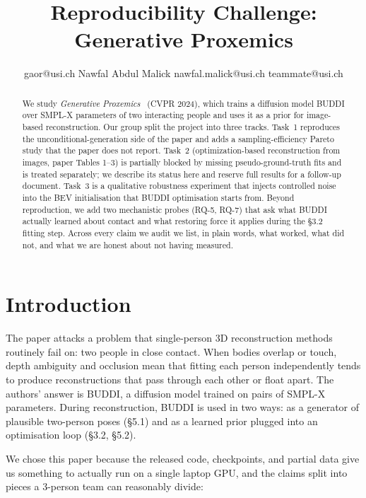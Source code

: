 \documentclass[10pt]{article}
\title{Reproducibility Challenge: Generative Proxemics}
\author{%
  \name [Author A] \email gaor@usi.ch
  \AND
  \name Nawfal Abdul Malick \email nawfal.malick@usi.ch
  \AND
  \name [Author C] \email teammate@usi.ch
}
\begin{document}
\maketitle

\begin{abstract}
We study \emph{Generative Proxemics}~\citep{muller2024generative} (CVPR 2024), which trains a diffusion model BUDDI over SMPL-X parameters of two interacting people and uses it as a prior for image-based reconstruction. Our group split the project into three tracks. Task~1 reproduces the unconditional-generation side of the paper and adds a sampling-efficiency Pareto study that the paper does not report. Task~2 (optimization-based reconstruction from images, paper Tables 1--3) is partially blocked by missing pseudo-ground-truth fits and is treated separately; we describe its status here and reserve full results for a follow-up document. Task~3 is a qualitative robustness experiment that injects controlled noise into the BEV initialisation that BUDDI optimisation starts from. Beyond reproduction, we add two mechanistic probes (RQ-5, RQ-7) that ask what BUDDI actually learned about contact and what restoring force it applies during the §3.2 fitting step. Across every claim we audit we list, in plain words, what worked, what did not, and what we are honest about not having measured.
\end{abstract}

\section{Introduction}

The paper attacks a problem that single-person 3D reconstruction methods routinely fail on: two people in close contact. When bodies overlap or touch, depth ambiguity and occlusion mean that fitting each person independently tends to produce reconstructions that pass through each other or float apart. The authors' answer is BUDDI, a diffusion model trained on pairs of SMPL-X~\citep{pavlakos2019smplx} parameters. During reconstruction, BUDDI is used in two ways: as a generator of plausible two-person poses (§5.1) and as a learned prior plugged into an optimisation loop (§3.2, §5.2).

We chose this paper because the released code, checkpoints, and partial data give us something to actually run on a single laptop GPU, and the claims split into pieces a 3-person team can reasonably divide:
\end{document}
